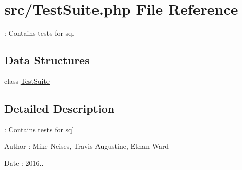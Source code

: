 \hypertarget{_test_suite_8php}{}\section{src/\+Test\+Suite.php File Reference}
\label{_test_suite_8php}


\+: Contains tests for sql  


\subsection*{Data Structures}
\begin{DoxyCompactItemize}
\item 
class \hyperlink{class_test_suite}{Test\+Suite}
\end{DoxyCompactItemize}


\subsection{Detailed Description}
\+: Contains tests for sql 

\begin{DoxyAuthor}{Author}
\+: Mike Neises, Travis Augustine, Ethan Ward 
\end{DoxyAuthor}
\begin{DoxyDate}{Date}
\+: 2016.. 
\end{DoxyDate}
